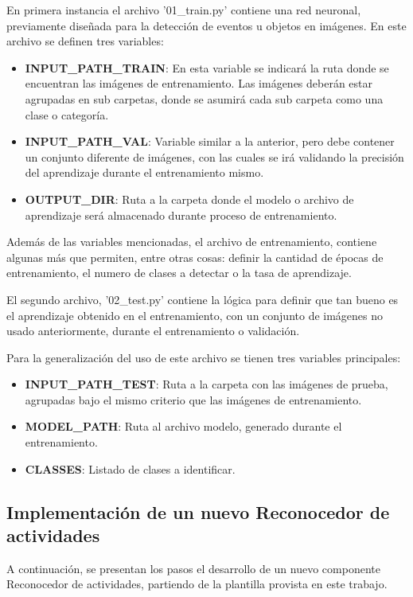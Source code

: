             En primera instancia el archivo '01\_train.py' contiene una red neuronal, previamente diseñada para la detección de eventos u objetos en imágenes. En este archivo se definen tres variables:
            \begin{itemize}
                \item \textbf{INPUT\_PATH\_TRAIN}: En esta variable se indicará la ruta donde se encuentran las imágenes de entrenamiento. Las imágenes deberán estar agrupadas en sub carpetas, donde se asumirá cada sub carpeta como una clase o categoría.
                \item \textbf{INPUT\_PATH\_VAL}: Variable similar a la anterior, pero debe contener un conjunto diferente de imágenes, con las cuales se irá validando la precisión del aprendizaje durante el entrenamiento mismo.
                \item \textbf{OUTPUT\_DIR}: Ruta a la carpeta donde el modelo o archivo de aprendizaje será almacenado durante proceso de entrenamiento.
            \end{itemize}
            
            Además de las variables mencionadas, el archivo de entrenamiento, contiene algunas más que permiten, entre otras cosas: definir la cantidad de épocas de entrenamiento, el numero de clases a detectar o la tasa de aprendizaje.
            
            El segundo archivo, '02\_test.py' contiene la lógica para definir que tan bueno es el aprendizaje obtenido en el entrenamiento, con un conjunto de imágenes no usado anteriormente, durante el entrenamiento o validación.
            
            Para la generalización del uso de este archivo se tienen tres variables principales: 
            
            \begin{itemize}
                \item \textbf{INPUT\_PATH\_TEST}: Ruta a la carpeta con las imágenes de prueba, agrupadas bajo el mismo criterio que las imágenes de entrenamiento.
                \item \textbf{MODEL\_PATH}: Ruta al archivo modelo, generado durante el entrenamiento.
                \item \textbf{CLASSES}: Listado de clases a identificar.
            \end{itemize}
            
    \subsection{Implementación de un nuevo Reconocedor de actividades}
    \label{sub:DevelopingHAR}
        A continuación, se presentan los pasos el desarrollo de un nuevo componente Reconocedor de actividades, partiendo de la plantilla provista en este trabajo.
    
